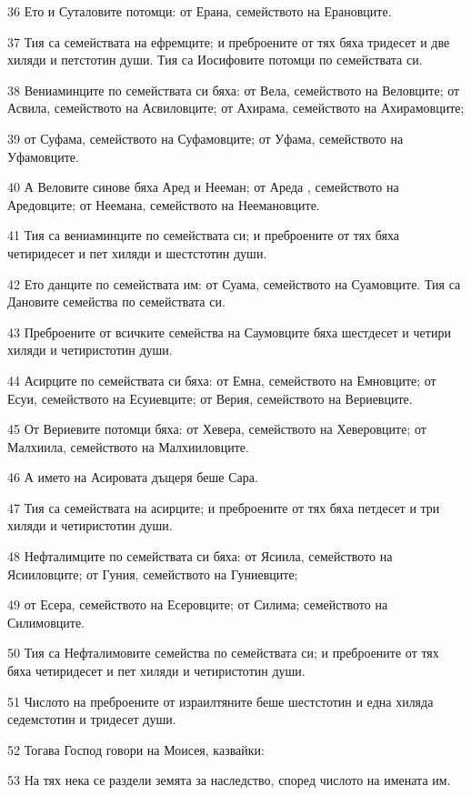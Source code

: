 \par 36 Ето и Суталовите потомци: от Ерана, семейството на Ерановците.
\par 37 Тия са семействата на ефремците; и преброените от тях бяха тридесет и две хиляди и петстотин души. Тия са Иосифовите потомци по семействата си.
\par 38 Вениаминците по семействата си бяха: от Вела, семейството на Веловците; от Асвила, семейството на Асвиловците; от Ахирама, семейството на Ахирамовците;
\par 39 от Суфама, семейството на Суфамовците; от Уфама, семейството на Уфамовците.
\par 40 А Веловите синове бяха Аред и Нееман; от Ареда , семейството на Аредовците; от Неемана, семейството на Неемановците.
\par 41 Тия са вениаминците по семействата си; и преброените от тях бяха четиридесет и пет хиляди и шестстотин души.
\par 42 Ето данците по семействата им: от Суама, семейството на Суамовците. Тия са Дановите семейства по семействата си.
\par 43 Преброените от всичките семейства на Саумовците бяха шестдесет и четири хиляди и четиристотин души.
\par 44 Асирците по семействата си бяха: от Емна, семейството на Емновците; от Есуи, семейството на Есуиевците; от Верия, семейството на Вериевците.
\par 45 От Вериевите потомци бяха: от Хевера, семейството на Хеверовците; от Малхиила, семейството на Малхииловците.
\par 46 А името на Асировата дъщеря беше Сара.
\par 47 Тия са семействата на асирците; и преброените от тях бяха петдесет и три хиляди и четиристотин души.
\par 48 Нефталимците по семействата си бяха: от Ясиила, семейството на Ясииловците; от Гуния, семейството на Гуниевците;
\par 49 от Есера, семейството на Есеровците; от Силима; семейството на Силимовците.
\par 50 Тия са Нефталимовите семейства по семействата си; и преброените от тях бяха четиридесет и пет хиляди и четиристотин души.
\par 51 Числото на преброените от израилтяните беше шестстотин и една хиляда седемстотин и тридесет души.
\par 52 Тогава Господ говори на Моисея, казвайки:
\par 53 На тях нека се раздели земята за наследство, според числото на имената им.
